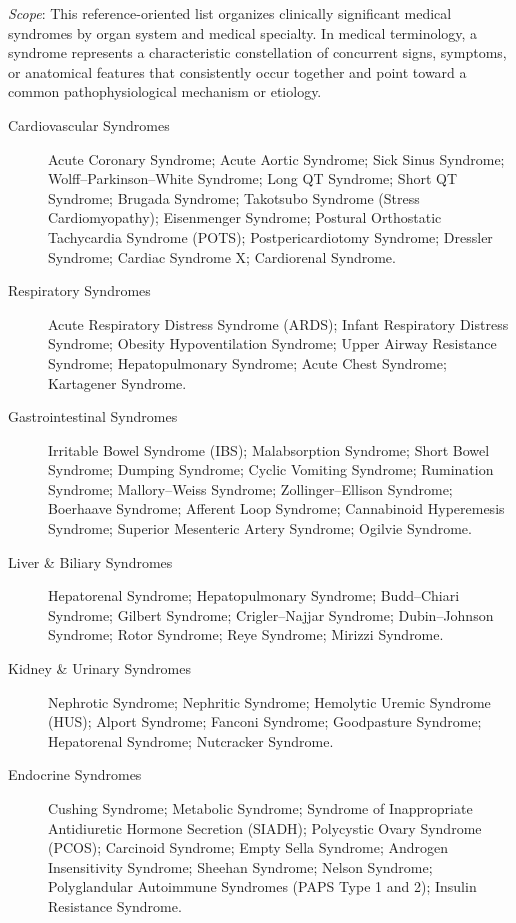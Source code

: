 \small
\noindent\textit{Scope}: This reference-oriented list organizes clinically significant medical syndromes by organ system and medical specialty. In medical terminology, a syndrome represents a characteristic constellation of concurrent signs, symptoms, or anatomical features that consistently occur together and point toward a common pathophysiological mechanism or etiology.

\medskip
\begin{description}
\item[Cardiovascular Syndromes] Acute Coronary Syndrome; Acute Aortic Syndrome; Sick Sinus Syndrome; Wolff–Parkinson–White Syndrome; Long QT Syndrome; Short QT Syndrome; Brugada Syndrome; Takotsubo Syndrome (Stress Cardiomyopathy); Eisenmenger Syndrome; Postural Orthostatic Tachycardia Syndrome (POTS); Postpericardiotomy Syndrome; Dressler Syndrome; Cardiac Syndrome X; Cardiorenal Syndrome.

\item[Respiratory Syndromes] Acute Respiratory Distress Syndrome (ARDS); Infant Respiratory Distress Syndrome; Obesity Hypoventilation Syndrome; Upper Airway Resistance Syndrome; Hepatopulmonary Syndrome; Acute Chest Syndrome; Kartagener Syndrome.

\item[Gastrointestinal Syndromes] Irritable Bowel Syndrome (IBS); Malabsorption Syndrome; Short Bowel Syndrome; Dumping Syndrome; Cyclic Vomiting Syndrome; Rumination Syndrome; Mallory–Weiss Syndrome; Zollinger–Ellison Syndrome; Boerhaave Syndrome; Afferent Loop Syndrome; Cannabinoid Hyperemesis Syndrome; Superior Mesenteric Artery Syndrome; Ogilvie Syndrome.

\item[Liver \& Biliary Syndromes] Hepatorenal Syndrome; Hepatopulmonary Syndrome; Budd–Chiari Syndrome; Gilbert Syndrome; Crigler–Najjar Syndrome; Dubin–Johnson Syndrome; Rotor Syndrome; Reye Syndrome; Mirizzi Syndrome.

\item[Kidney \& Urinary Syndromes] Nephrotic Syndrome; Nephritic Syndrome; Hemolytic Uremic Syndrome (HUS); Alport Syndrome; Fanconi Syndrome; Goodpasture Syndrome; Hepatorenal Syndrome; Nutcracker Syndrome.

\item[Endocrine Syndromes] Cushing Syndrome; Metabolic Syndrome; Syndrome of Inappropriate Antidiuretic Hormone Secretion (SIADH); Polycystic Ovary Syndrome (PCOS); Carcinoid Syndrome; Empty Sella Syndrome; Androgen Insensitivity Syndrome; Sheehan Syndrome; Nelson Syndrome; Polyglandular Autoimmune Syndromes (PAPS Type 1 and 2); Insulin Resistance Syndrome.


\end{description}
